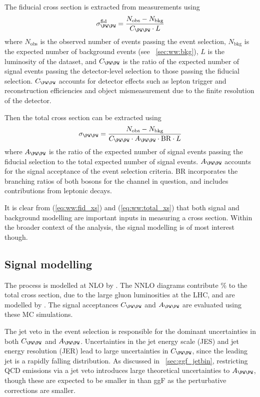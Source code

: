 The fiducial cross section is extracted from measurements using
\begin{equation}
	\sigma_{\WW}^{\text{fid}} = \frac{N_{\text{obs}} - N_{\text{bkg}}}{C_{\WW} \cdot L}
	\label{eq:ww:fid_xs}
\end{equation}
where $N_{\text{obs}}$ is the observed number of events passing the event selection, 
$N_{\text{bkg}}$ is the expected number of background events (see 
\Section~\ref{sec:ww:bkg}), $L$ is the luminosity of the dataset, and $C_{\WW}$ is the 
ratio of the expected number of signal events passing the detector-level selection to 
those passing the fiducial selection. $C_{\WW}$ accounts for detector effects such as 
lepton trigger and reconstruction efficiencies and object mismeasurement due to the 
finite resolution of the detector.

Then the total cross section can be extracted using
\begin{equation}
	\sigma_{\WW} = \frac{N_{\text{obs}} - N_{\text{bkg}}}{C_{\WW} \cdot A_{\WW} \cdot \text{BR} \cdot L}
	\label{eq:ww:total_xs}
\end{equation}
where $A_{\WW}$ is the ratio of the expected number of signal events passing the fiducial 
selection to the total expected number of signal events. $A_{\WW}$ accounts for the 
signal acceptance of the event selection criteria. BR incorporates the branching ratios 
of both \PW bosons for the channel in question, and includes contributions from leptonic 
\Ptau decays.

It is clear from (\ref{eq:ww:fid_xs}) and (\ref{eq:ww:total_xs}) that both signal and 
background modelling are important inputs in measuring a cross section. Within the 
broader context of the \HWW analysis, the signal modelling is of most interest though.



\subsection{Signal modelling}
\label{sec:ww:signal}

The \WW process is modelled at NLO by \meps{\mcatnlo}{\fherwig}. The NNLO \ggWW diagrams 
contribute \% to the total cross section, due to the large gluon luminosities at 
the LHC, and are modelled by \meps{\ggtoww}{\fherwig} \cite{gg2ww}. The signal 
acceptances $C_{\WW}$ and $A_{\WW}$ are evaluated using these MC simulations.

The jet veto in the event selection is responsible for the dominant uncertainties in both 
$C_{\WW}$ and $A_{\WW}$. Uncertainties in the jet energy scale (JES) and jet energy 
resolution (JER) lead to large uncertainties in $C_{\WW}$, since the leading jet \pt is a 
rapidly falling distribution. As discussed in \Section~\ref{sec:ggf_jetbin}, restricting 
QCD emissions via a jet veto introduces large theoretical uncertainties to $A_{\WW}$, 
though these are expected to be smaller in \WW than ggF as the perturbative corrections 
are smaller.


